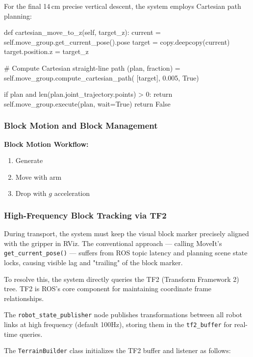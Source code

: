 \documentclass[12pt, a4paper]{article}
\begin{document}
For the final 14\,cm precise vertical descent, the system employs Cartesian path planning:

\begin{pythoncode}
def cartesian_move_to_z(self, target_z):
    current = self.move_group.get_current_pose().pose
    target = copy.deepcopy(current)
    target.position.z = target_z
    
    # Compute Cartesian straight-line path
    (plan, fraction) = self.move_group.compute_cartesian_path(
        [target], 0.005, True)
    
    if plan and len(plan.joint_trajectory.points) > 0:
        return self.move_group.execute(plan, wait=True)
    return False
\end{pythoncode}

\subsubsection{Block Motion and Block Management}

\textbf{Block Motion Workflow:}

\begin{enumerate}
    \item Generate
    \item Move with arm
    \item Drop with $g$ acceleration
\end{enumerate}

\subsubsection{High-Frequency Block Tracking via TF2}

During transport, the system must keep the visual block marker precisely aligned with the gripper in RViz. The conventional approach — calling MoveIt's \texttt{get\_current\_pose()} — suffers from ROS topic latency and planning scene state locks, causing visible lag and "trailing" of the block marker.

To resolve this, the system directly queries the TF2 (Transform Framework 2) tree. TF2 is ROS's core component for maintaining coordinate frame relationships.

The \texttt{robot\_state\_publisher} node publishes transformations between all robot links at high frequency (default 100Hz), storing them in the \texttt{tf2\_buffer} for real-time queries.

The \texttt{TerrainBuilder} class initializes the TF2 buffer and listener as follows:
\end{document}
